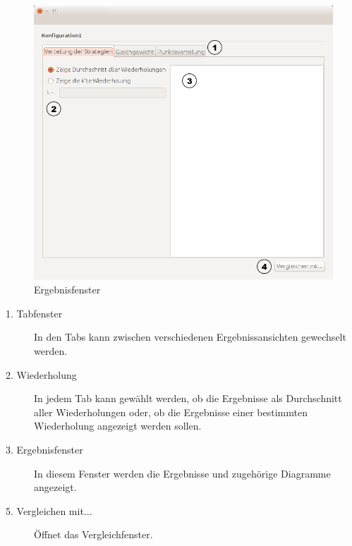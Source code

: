\begin{figure}[H] 
  \centering
     \includegraphics[width=1.1\textwidth]{GUI_Entwurf/EinfacheErgebnisse.png}
  \caption{Ergebnisfenster}
  \label{fig:Bild7}
\end{figure}

\begin{description}

\item[1. Tabfenster] In den Tabs kann zwischen verschiedenen Ergebnissansichten gewechselt werden.

\item[2. Wiederholung] In jedem Tab kann gewählt werden, ob die Ergebnisse als Durchschnitt aller Wiederholungen oder, ob die Ergebnisse einer bestimmten Wiederholung angezeigt werden sollen.

\item[3. Ergebnisfenster] In diesem Fenster werden die Ergebnisse und zugehörige Diagramme angezeigt.

\item[5. Vergleichen mit...] Öffnet das Vergleichfenster.

\end{description}


